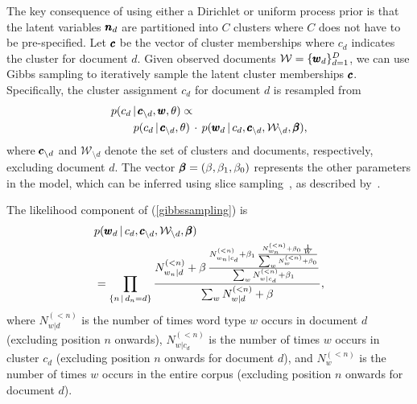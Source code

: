 \documentclass[]{article}
\begin{document}
The key consequence of using either a Dirichlet or uniform process
prior is that the latent variables $\pmb{n}_d$ are partitioned into $C$
clusters where $C$ does not have to be pre-specified.  Let $\pmb{c}$ be
the vector of cluster memberships where $c_d$ indicates the cluster
for document $d$.  Given observed documents $\mathcal{W} = \{\pmb{w}_d
\}_{d=1}^D$, we can use Gibbs sampling to
iteratively sample the latent cluster memberships $\pmb{c}$.
Specifically, the cluster assignment $c_d$ for document $d$ is
resampled from
\begin{align}
&p(c_d \,|\, \pmb{c}_{\setminus d}, \pmb{w}, \theta) \propto \notag\\
&\qquad p(c_d \,|\, \pmb{c}_{\setminus d}, \theta) \, \cdot \, p(\pmb{w}_d \,|\, c_d,
\pmb{c}_{\setminus d}, \mathcal{W}_{\setminus d}, \pmb{\beta}),\label{gibbssampling}
\end{align}
where $\pmb{c}_{\setminus d}$ and $\mathcal{W}_{\setminus d}$ denote the
set of clusters and documents, respectively, excluding document $d$.
The vector $\pmb{\beta} = (\beta, \beta_1, \beta_0)$ represents the other parameters
in the model, which can be inferred using slice
sampling~\cite{neal03slice}, as described by~\cite{Wal08}.

The likelihood component of (\ref{gibbssampling}) is 
\begin{align}
&p(\pmb{w}_d \,|\, c_d,
\pmb{c}_{\setminus d}, \mathcal{W}_{\setminus d}, \pmb{\beta})\notag\\
&= \prod_{\{ n \,|\, d_n = d\}} \frac{N_{w_n|d}^{(<n)} + \beta\,
  \frac{N_{w_n|c_d}^{(<n)} + \beta_1\, \frac{N_{w_n}^{(<n)} + \beta_0\,
      \frac{1}{W}}{\sum_w N_w^{(<n)} + \beta_0}}{\sum_w N_{w|c_d}^{(<n)} +
    \beta_1}}{\sum_w N_{w|d}^{(<n)} + \beta},
\end{align}
where $N_{w|d}^{(<n)}$ is the number of times word type $w$ occurs in
document $d$ (excluding position $n$ onwards), $N_{w|c_d}^{(<n)}$ is
the number of times $w$ occurs in cluster $c_d$ (excluding position
$n$ onwards for document $d$), and $N_w^{(<n)}$ is the number of times
$w$ occurs in the entire corpus (excluding position $n$ onwards for
document $d$).
\end{document}
